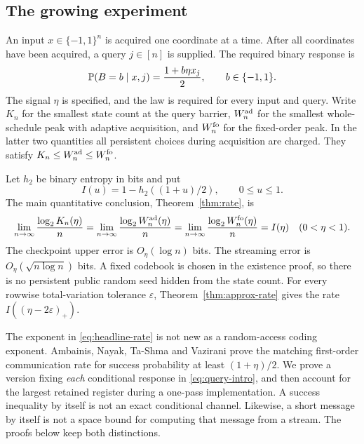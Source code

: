 \subsection{The growing experiment}
An input $x\in\{-1,1\}^n$ is acquired one coordinate at a time. After all
coordinates have been acquired, a query $j\in[n]$ is supplied. The required
binary response is
\begin{equation}\label{eq:query-intro}
 \mathbb P(B=b\mid x,j)=\frac{1+b\eta x_j}{2},\qquad b\in\{-1,1\}.
\end{equation}
The signal $\eta$ is specified, and the law is required for every input
and query. Write $K_n$ for the smallest state count at the query barrier,
$W_n^{\rm ad}$ for the smallest whole-schedule peak with adaptive
acquisition, and $W_n^{\rm fo}$ for the fixed-order peak. In the latter two
quantities all persistent choices during acquisition are charged. They
satisfy $K_n\le W_n^{\rm ad}\le W_n^{\rm fo}$.

Let $h_2$ be binary entropy in bits and put
\begin{equation}\label{eq:rate-intro}
 I(u)=1-h_2((1+u)/2),\qquad 0\le u\le1.
\end{equation}
The main quantitative conclusion, Theorem~\ref{thm:rate}, is
\begin{equation}\label{eq:headline-rate}
 \lim_{n\to\infty}\frac{\log_2K_n(\eta)}n
 =\lim_{n\to\infty}\frac{\log_2W_n^{\rm ad}(\eta)}n
 =\lim_{n\to\infty}\frac{\log_2W_n^{\rm fo}(\eta)}n=I(\eta)
 \quad(0<\eta<1).
\end{equation}
The checkpoint upper error is $O_\eta(\log n)$ bits. The streaming error
is $O_\eta(\sqrt{n\log n})$ bits. A fixed codebook is chosen in the
existence proof, so there is no persistent public random seed hidden from
the state count. For every rowwise total-variation tolerance $\varepsilon$,
Theorem~\ref{thm:approx-rate} gives the rate $I((\eta-2\varepsilon)_+)$.

The exponent in \eqref{eq:headline-rate} is not new as a random-access
coding exponent. Ambainis, Nayak, Ta-Shma and Vazirani
\cite{ANTVpre,ANTV} prove the matching first-order communication rate
for success probability at least $(1+\eta)/2$. We prove a version fixing
\emph{each} conditional response in \eqref{eq:query-intro}, and then
account for the largest retained register during a one-pass implementation.
A success inequality by itself is not an exact conditional channel.
Likewise, a short message by itself is not a space bound for computing
that message from a stream. The proofs below keep both distinctions.

